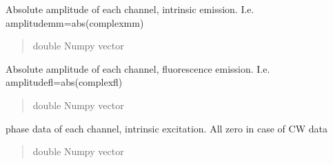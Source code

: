 \documentclass[letterpaper,10pt,english]{sphinxmanual}
\begin{document}
\begin{fulllineitems}
\begin{fulllineitems}
\begin{quote}
\begin{description}
\end{description}\end{quote}

\end{fulllineitems}


\begin{fulllineitems}
\label{\detokenize{_autosummary/nirfasterff.base.data.FLdata:nirfasterff.base.data.FLdata.amplitudemm}}
\pysigstartsignatures
{}
\pysigstopsignatures
\sphinxAtStartPar
Absolute amplitude of each channel, intrinsic emission. I.e. amplitudemm=abs(complexmm)
\begin{quote}\begin{description}
\sphinxAtStartPar
double Numpy vector

\end{description}\end{quote}

\end{fulllineitems}


\begin{fulllineitems}
\label{\detokenize{_autosummary/nirfasterff.base.data.FLdata:nirfasterff.base.data.FLdata.amplitudefl}}
\pysigstartsignatures
{}
\pysigstopsignatures
\sphinxAtStartPar
Absolute amplitude of each channel, fluorescence emission. I.e. amplitudefl=abs(complexfl)
\begin{quote}\begin{description}
\sphinxAtStartPar
double Numpy vector

\end{description}\end{quote}

\end{fulllineitems}


\begin{fulllineitems}
\label{\detokenize{_autosummary/nirfasterff.base.data.FLdata:nirfasterff.base.data.FLdata.phasex}}
\pysigstartsignatures
{}
\pysigstopsignatures
\sphinxAtStartPar
phase data of each channel, intrinsic excitation. All zero in case of CW data
\begin{quote}\begin{description}
\sphinxAtStartPar
double Numpy vector


\end{description}
\end{quote}
\end{fulllineitems}
\end{fulllineitems}
\end{document}
